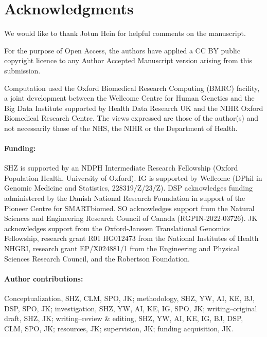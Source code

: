 \documentclass[12pt]{article}
\begin{document}
\bigskip


\section*{Acknowledgments}
We would like to thank Jotun Hein for helpful comments on the manuscript.

For the purpose of Open Access, the authors have applied a CC BY public
copyright licence to any Author Accepted Manuscript version arising from this
submission.

Computation used the Oxford Biomedical Research Computing (BMRC) facility, a
joint development between the Wellcome Centre for Human Genetics and the Big
Data Institute supported by Health Data Research UK and the NIHR Oxford
Biomedical Research Centre. The views expressed are those of the author(s) and
not necessarily those of the NHS, the NIHR or the Department of Health.

\paragraph*{Funding:}
SHZ is supported by an NDPH Intermediate Research Fellowship (Oxford Population
Health, University of Oxford).
IG is supported by Wellcome (DPhil in Genomic Medicine and Statistics, 228319/Z/23/Z).
DSP acknowledges funding administered by the Danish National Research Foundation
in support of the Pioneer Centre for SMARTbiomed.
SO acknowledges support from the Natural Sciences and Engineering Research Council of Canada (RGPIN-2022-03726).
JK acknowledges support from the
Oxford-Janssen Translational Genomics Fellowship,
research grant R01 HG012473 from the National Institutes of Health NHGRI,
research grant EP/X024881/1 from the Engineering and Physical Sciences Research Council,
and the Robertson Foundation.

\paragraph*{Author contributions:}
Conceptualization, SHZ, CLM, SPO, JK;
methodology, SHZ, YW, AI, KE, BJ, DSP, SPO, JK;
investigation, SHZ, YW, AI, KE, IG, SPO, JK;
writing--original draft, SHZ, JK;
writing--review \& editing, SHZ, YW, AI, KE, IG, BJ, DSP, CLM, SPO, JK;
resources, JK;
supervision, JK;
funding acquisition, JK.
\end{document}
